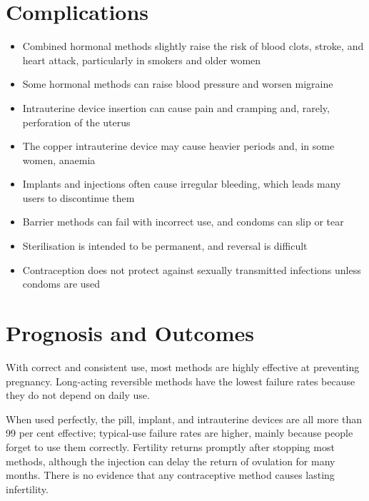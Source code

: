 \section*{Complications}
\begin{itemize}
    \item Combined hormonal methods slightly raise the risk of blood clots, stroke, and heart attack, particularly in smokers and older women
    \item Some hormonal methods can raise blood pressure and worsen migraine
    \item Intrauterine device insertion can cause pain and cramping and, rarely, perforation of the uterus
    \item The copper intrauterine device may cause heavier periods and, in some women, anaemia
    \item Implants and injections often cause irregular bleeding, which leads many users to discontinue them
    \item Barrier methods can fail with incorrect use, and condoms can slip or tear
    \item Sterilisation is intended to be permanent, and reversal is difficult
    \item Contraception does not protect against sexually transmitted infections unless condoms are used
\end{itemize}

\section*{Prognosis and Outcomes}
With correct and consistent use, most methods are highly effective at preventing pregnancy. Long-acting reversible methods have the lowest failure rates because they do not depend on daily use.

When used perfectly, the pill, implant, and intrauterine devices are all more than 99 per cent effective; typical-use failure rates are higher, mainly because people forget to use them correctly. Fertility returns promptly after stopping most methods, although the injection can delay the return of ovulation for many months. There is no evidence that any contraceptive method causes lasting infertility.

